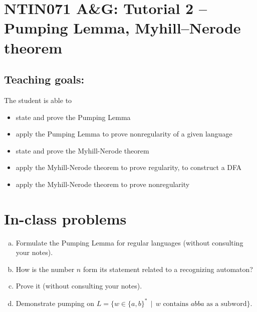 \documentclass[a4paper,12pt]{amsart}
\begin{document}
\thispagestyle{empty}

\section*{NTIN071 A\&G: Tutorial 2 -- Pumping Lemma, Myhill--Nerode theorem}

\medskip

\subsection*{Teaching goals:} The student is able to

    \begin{itemize}\setlength{\itemsep}{0pt}
        \item state and prove the Pumping Lemma
        \item apply the Pumping Lemma to prove nonregularity of a given language
        \item state and prove the Myhill-Nerode theorem
        \item apply the Myhill-Nerode theorem to prove regularity, to construct a DFA
        \item apply the Myhill-Nerode theorem to prove nonregularity
    \end{itemize}

\section*{In-class problems}


\medskip\begin{problem}
    
    \begin{enumerate}[(a)]\setlength\itemsep{6pt}
        \item Formulate the Pumping Lemma for regular languages (without consulting your notes).
        \item How is the number $n$ form its statement related to a recognizing automaton?
        \item Prove it (without consulting your notes).
        \item Demonstrate pumping on $L=\{w\in\{a,b\}^* \,\mid\,\text{$w$ contains $abba$ as a subword}\}$.
    \end{enumerate}

\end{problem}
    
\end{document}
